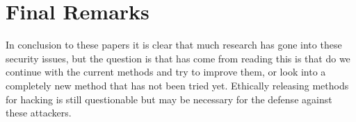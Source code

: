 \documentclass{scrartcl}
\begin{document}
\section{Final Remarks}
In conclusion to these papers it is clear that much research has gone into these security issues, but the question is that has come from reading this is that do we continue with the current methods and try to improve them, or look into a completely new method that has not been tried yet. Ethically releasing methods for hacking is still questionable but may be necessary for the defense against these attackers.
	
	
	
	
	
	
\end{document}
